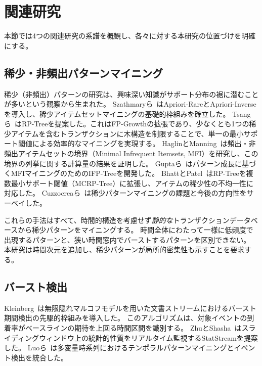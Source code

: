 \section{関連研究}\label{sec:related}

本節では4つの関連研究の系譜を概観し、各々に対する本研究の位置づけを明確にする。

\subsection{稀少・非頻出パターンマイニング}

稀少（非頻出）パターンの研究は、興味深い知識がサポート分布の裾に潜むことが多いという観察から生まれた。
Szathmaryら~\cite{szathmary2007rare}はApriori-RareとApriori-Inverseを導入し、稀少アイテムセットマイニングの基礎的枠組みを確立した。
Tsangら~\cite{tsang2011rptree}はRP-Treeを提案した。これはFP-Growthの拡張であり、少なくとも1つの稀少アイテムを含むトランザクションに木構造を制限することで、単一の最小サポート閾値による効率的なマイニングを実現する。
HaglinとManning~\cite{haglin2007mfi}は頻出・非頻出アイテムセットの境界（Minimal Infrequent Itemsets, MFI）を研究し、この境界の列挙に関する計算量の結果を証明した。
Guptaら~\cite{gupta2012ifptree}はパターン成長に基づくMFIマイニングのためのIFP-Treeを開発した。
BhattとPatel~\cite{bhatt2015mcrp}はRP-Treeを複数最小サポート閾値（MCRP-Tree）に拡張し、アイテムの稀少性の不均一性に対応した。
Cuzzocreaら~\cite{cuzzocrea2018rare}は稀少パターンマイニングの課題と今後の方向性をサーベイした。

これらの手法はすべて、時間的構造を考慮せず\emph{静的な}トランザクションデータベースから稀少パターンをマイニングする。
時間全体にわたって一様に低頻度で出現するパターンと、狭い時間窓内でバーストするパターンを区別できない。
本研究は時間次元を追加し、稀少パターンが局所的密集性も示すことを要求する。

\subsection{バースト検出}

Kleinberg~\cite{kleinberg2003bursty}は無限隠れマルコフモデルを用いた文書ストリームにおけるバースト期間検出の先駆的枠組みを導入した。
このアルゴリズムは、対象イベントの到着率がベースラインの期待を上回る時間区間を識別する。
ZhuとShasha~\cite{zhu2002statstream}はスライディングウィンドウ上の統計的性質をリアルタイム監視するStatStreamを提案した。
Luoら~\cite{luo2014temporal}は多変量時系列におけるテンポラルパターンマイニングとイベント検出を統合した。

